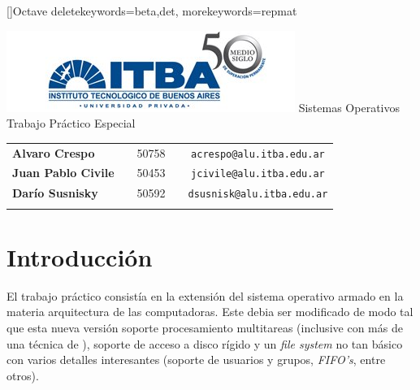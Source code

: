 \documentclass[a4paper,10pt]{article}
\begin{document}
\renewcommand{\lstlistingname}{C\'odigo Fuente}
[]{Octave}{
	deletekeywords={beta,det},
	morekeywords={repmat}
} 
\begin{titlepage}
        \thispagestyle{empty}
        \begin{center}
                \includegraphics{./images/itba.jpg}
                \vfill
                \Huge{Sistemas Operativos}\\
                \vspace{1cm}
                \huge{Trabajo Práctico Especial}\\
        \end{center}
        \vspace{2cm}
        \large{
                \begin{tabular}{lcrc}
                        \textbf{Alvaro Crespo} & & 50758 & \ \ \texttt{acrespo@alu.itba.edu.ar}\\
                        \textbf{Juan Pablo Civile} & & 50453 & \ \ \texttt{jcivile@alu.itba.edu.ar}\\
                        \textbf{Darío Susnisky} & & 50592 & \ \ \texttt{dsusnisk@alu.itba.edu.ar}\\
                        \\ 
                \end{tabular}
        }
        \vfill
\end{titlepage}

\setcounter{page}{1}

\tableofcontents
\newpage
\section{Introducción}
El trabajo práctico consistía en la extensión del sistema operativo armado en la materia arquitectura de las 
computadoras. Este debia ser modificado de modo tal que esta nueva versión soporte procesamiento multitareas
 (inclusive con más de una técnica de ), soporte de acceso a disco rígido y un \textit{file system}
 no tan básico con varios detalles interesantes (soporte de usuarios y grupos, \textit{FIFO's}, entre otros).
\end{document}
